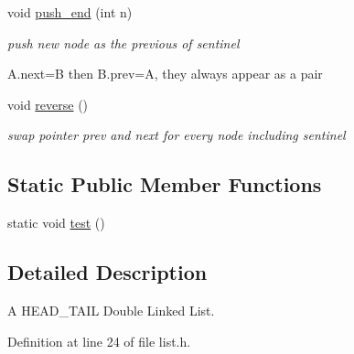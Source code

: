 \begin{DoxyCompactItemize}
\item 
void \hyperlink{classdlist_a8b296336bec13013bc4068b2d5285e73}{push\-\_\-end} (int n)
\begin{DoxyCompactList}\small\item\em push new node as the previous of sentinel\par
 A.\-next=B then B.\-prev=A, they always appear as a pair \end{DoxyCompactList}\item 
void \hyperlink{classdlist_aec0249d97bef78564429292903a5a331}{reverse} ()
\begin{DoxyCompactList}\small\item\em swap pointer prev and next for every node including sentinel \end{DoxyCompactList}\end{DoxyCompactItemize}
\subsection*{Static Public Member Functions}
\begin{DoxyCompactItemize}
\item 
static void \hyperlink{classdlist_a4939b60463b87c6097dd8d098e2f4b52}{test} ()
\end{DoxyCompactItemize}


\subsection{Detailed Description}
A H\-E\-A\-D\-\_\-\-T\-A\-I\-L Double Linked List. 

Definition at line 24 of file list.\-h.



